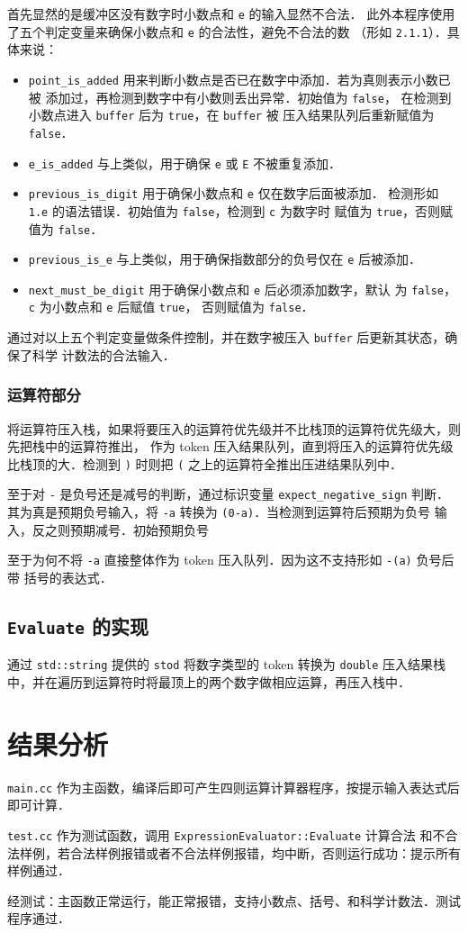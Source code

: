 \documentclass[UTF8, 12pt]{ctexart}
\begin{document}
首先显然的是缓冲区没有数字时小数点和 \texttt{e} 的输入显然不合法．
此外本程序使用了五个判定变量来确保小数点和 \texttt{e} 的合法性，避免不合法的数
（形如 \verb|2.1.1|）．具体来说：
\begin{itemize}
  \item \texttt{point\_is\_added} 用来判断小数点是否已在数字中添加．若为真则表示小数已被
  添加过，再检测到数字中有小数则丢出异常．初始值为 \texttt{false}，
  在检测到小数点进入 \texttt{buffer} 后为 \texttt{true}，在 \texttt{buffer} 被
  压入结果队列后重新赋值为 \texttt{false}．
  \item \texttt{e\_is\_added} 与上类似，用于确保 \texttt{e} 或 \texttt{E} 不被重复添加．
  \item \texttt{previous\_is\_digit} 用于确保小数点和 \texttt{e} 仅在数字后面被添加．
  检测形如 \verb|1.e| 的语法错误．初始值为 \texttt{false}，检测到 \texttt{c} 为数字时
  赋值为 \texttt{true}，否则赋值为 \texttt{false}．
  \item \texttt{previous\_is\_e} 与上类似，用于确保指数部分的负号仅在 \texttt{e} 后被添加．
  \item \texttt{next\_must\_be\_digit} 用于确保小数点和 \texttt{e} 后必须添加数字，默认
  为 \texttt{false}，\texttt{c} 为小数点和 \texttt{e} 后赋值 \texttt{true}，
  否则赋值为 \texttt{false}．
\end{itemize}
通过对以上五个判定变量做条件控制，并在数字被压入 \texttt{buffer} 后更新其状态，确保了科学
计数法的合法输入．
\subsubsection{运算符部分}
将运算符压入栈，如果将要压入的运算符优先级并不比栈顶的运算符优先级大，则先把栈中的运算符推出，
作为 token 压入结果队列，直到将压入的运算符优先级比栈顶的大．检测到 \texttt{)} 时则把 
\texttt{(} 之上的运算符全推出压进结果队列中．

至于对 \texttt{-} 是负号还是减号的判断，通过标识变量 \texttt{expect\_negative\_sign} 
判断．其为真是预期负号输入，将 \verb|-a| 转换为 \verb|(0-a)|．当检测到运算符后预期为负号
输入，反之则预期减号．初始预期负号

至于为何不将 \texttt{-a} 直接整体作为 token 压入队列．因为这不支持形如 \verb|-(a)| 负号后带
括号的表达式．
\subsection{\texttt{Evaluate} 的实现}
通过 \texttt{std::string} 提供的 \texttt{stod} 将数字类型的 token 转换为 \texttt{double} 
压入结果栈中，并在遍历到运算符时将最顶上的两个数字做相应运算，再压入栈中．
\section{结果分析}
\texttt{main.cc} 作为主函数，编译后即可产生四则运算计算器程序，按提示输入表达式后即可计算．

\texttt{test.cc} 作为测试函数，调用 \texttt{ExpressionEvaluator::Evaluate} 计算合法
和不合法样例，若合法样例报错或者不合法样例报错，均中断，否则运行成功：提示所有样例通过．

经测试：主函数正常运行，能正常报错，支持小数点、括号、和科学计数法．测试程序通过．
\end{document}
